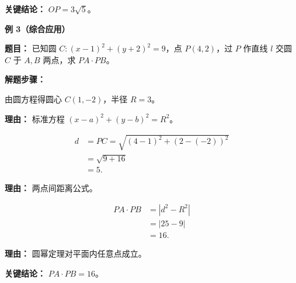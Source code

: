 \begin{examplebox}
	\textbf{\textcolor{CExample}{关键结论：}}
	\textbf{$OP = 3\sqrt{5}$}。

	\medskip
	\textbf{\textcolor{CExample}{例 3（综合应用）}}

	\textbf{\textcolor{CExample}{题目：}}
	已知圆 $C: (x-1)^{2}+(y+2)^{2}=9$，点 $P(4,2)$，过 $P$ 作直线 $l$ 交圆 $C$ 于 $A,B$ 两点，求 $PA\cdot PB$。

	\textbf{\textcolor{CExample}{解题步骤：}}
	\begin{description}[style=nextline, leftmargin=2.8em, labelsep=0.5em, itemsep=0.45em]
		\item[\textbf{第一步（求圆心半径）：}] 由圆方程得圆心 $C(1,-2)$，半径 $R=3$。
			\par\textbf{理由：} 标准方程 $(x-a)^{2}+(y-b)^{2}=R^{2}$。
		\item[\textbf{第二步（计算点圆心距）：}]
			\[
				\begin{aligned}
					d &= PC = \sqrt{(4-1)^{2}+(2-(-2))^{2}} \\
					&= \sqrt{9+16} \\
					&= 5.
			\end{aligned}
			\]
			\par\textbf{理由：} 两点间距离公式。
		\item[\textbf{第三步（应用定理求积）：}]
			\[
				\begin{aligned}
					PA\cdot PB &= |d^{2}-R^{2}| \\
					&= |25-9| \\
					&= 16.
			\end{aligned}
			\]
			\par\textbf{理由：} 圆幂定理对平面内任意点成立。
	\end{description}

	\textbf{\textcolor{CExample}{关键结论：}}
	\textbf{$PA\cdot PB = 16$}。
\end{examplebox}
